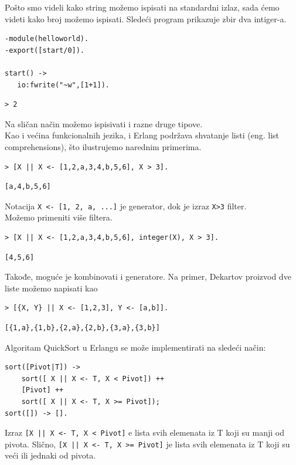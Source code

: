 \documentclass[a4paper]{article}
\begin{document}
{Pošto smo videli kako string možemo ispisati na standardni izlaz, sada ćemo videti kako broj možemo ispisati. Sledeći program prikazuje zbir dva intiger-a.

\begin{verbatim}
-module(helloworld).
-export([start/0]).

start() ->
   io:fwrite("~w",[1+1]).
\end{verbatim}
\begin{verbatim}
> 2
\end{verbatim}

Na sličan način možemo ispisivati i razne druge tipove.\\

Kao i većina funkcionalnih jezika, i Erlang podržava shvatanje listi (eng. list comprehensions), što ilustrujemo narednim primerima.
\begin{verbatim}
> [X || X <- [1,2,a,3,4,b,5,6], X > 3].
\end{verbatim}
\begin{verbatim}
[a,4,b,5,6]
\end{verbatim}
Notacija {\texttt{X <- [1, 2, a, ...]}} je generator, dok je izraz {\texttt{X>3}} filter.\\

Možemo primeniti više filtera.
\begin{verbatim}
> [X || X <- [1,2,a,3,4,b,5,6], integer(X), X > 3].
\end{verbatim}
\begin{verbatim}
[4,5,6]
\end{verbatim}

Takođe, moguće je kombinovati i generatore. Na primer, Dekartov proizvod dve liste možemo napisati kao
\begin{verbatim}
> [{X, Y} || X <- [1,2,3], Y <- [a,b]].
\end{verbatim}
\begin{verbatim}
[{1,a},{1,b},{2,a},{2,b},{3,a},{3,b}]
\end{verbatim}

Algoritam QuickSort u Erlangu se može implementirati na sledeći način:
\begin{verbatim}
sort([Pivot|T]) ->
    sort([ X || X <- T, X < Pivot]) ++
    [Pivot] ++
    sort([ X || X <- T, X >= Pivot]);
sort([]) -> [].
\end{verbatim}
Izraz {\texttt{[X || X <- T, X < Pivot]}} e lista svih elemenata iz T koji su manji od pivota. Slično, {\texttt{[X || X <- T, X >= Pivot]}} je lista svih elemenata iz T koji su veći ili jednaki od pivota.\\

}
\end{document}
